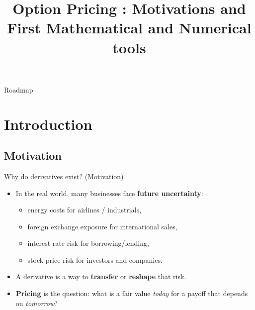 \documentclass[10pt,aspectratio=169]{beamer}
\title{Option Pricing : Motivations and First Mathematical and Numerical tools}
\author{}
\date{}
\begin{document}
\begin{frame}
  \titlepage
\end{frame}

\begin{frame}{Roadmap}
  \tableofcontents[hideallsubsections]
\end{frame}

\section{Introduction}

\subsection{Motivation}
\begin{frame}{Why do derivatives exist? (Motivation)}
\begin{itemize}
  \item In the real world, many businesses face \textbf{future uncertainty}:\pause
  \begin{itemize}
    \item energy costs for airlines / industrials,\pause
    \item foreign exchange exposure for international sales,\pause
    \item interest-rate risk for borrowing/lending,\pause
    \item stock price risk for investors and companies.\pause
  \end{itemize}
  \item A derivative is a way to \textbf{transfer} or \textbf{reshape} that risk.\pause
  \item \textbf{Pricing} is the question: what is a fair value \emph{today} for a payoff that depends on \emph{tomorrow}?
\end{itemize}
\end{frame}
\end{document}
